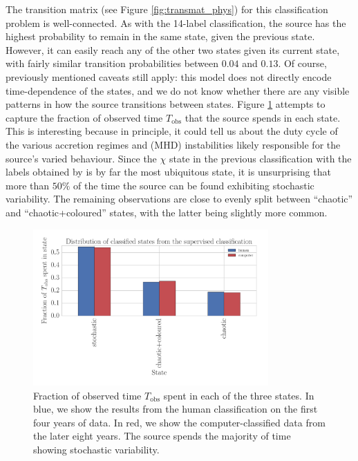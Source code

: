 \documentclass[12pt]{emulateapj}
\begin{document}
The transition matrix (see Figure \ref{fig:transmat_phys}) for this classification problem is well-connected. As with the 14-label classification, the source has the 
highest probability to remain in the same state, given the previous state. However, it can easily reach any of the other two states given its current state, with fairly 
similar transition probabilities between $0.04$ and $0.13$. Of course, previously mentioned caveats still apply: this model does not directly encode time-dependence of the states, and we do not know whether there are any visible patterns in how the source transitions between states. Figure \ref{fig:duration_phys} attempts to capture the fraction of observed time $T_\mathrm{obs}$ that the source spends in each state. This is interesting because in principle, it could tell us about the duty cycle of the various accretion regimes and (MHD) instabilities likely responsible for the source's varied behaviour.
Since the $\chi$ state in the previous classification with the labels obtained by \citet{belloni2000} is by far the most ubiquitous state, it is unsurprising that more 
than $50\%$ of the time the source can be found exhibiting stochastic variability. The remaining observations are close to evenly split between ``chaotic'' and 
``chaotic+coloured'' states, with the latter being slightly more common.

\begin{figure}[htbp]
\begin{center}
\includegraphics[width=9cm]{grs1915_supervised_phys_states_histogram.pdf}
\caption{Fraction of observed time $T_{\mathrm{obs}}$ spent in each of the three states. In blue, we show the results from the human classification on the first four 
years of data. In red, we show the computer-classified data from the later eight years. The source spends the majority of time showing stochastic variability.} 
\label{fig:duration_phys}
\end{center}
\end{figure}
\end{document}
